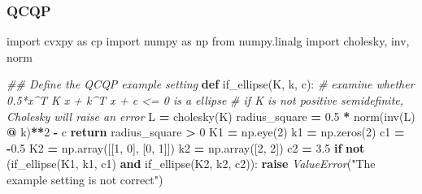 \documentclass[
]{book}
\newenvironment{Shaded}{\begin{snugshade}}{\end{snugshade}}
\newcommand{\CommentTok}[1]{\textcolor[rgb]{0.56,0.35,0.01}{\textit{#1}}}
\newcommand{\ControlFlowTok}[1]{\textcolor[rgb]{0.13,0.29,0.53}{\textbf{#1}}}
\newcommand{\DecValTok}[1]{\textcolor[rgb]{0.00,0.00,0.81}{#1}}
\newcommand{\FloatTok}[1]{\textcolor[rgb]{0.00,0.00,0.81}{#1}}
\newcommand{\ImportTok}[1]{#1}
\newcommand{\KeywordTok}[1]{\textcolor[rgb]{0.13,0.29,0.53}{\textbf{#1}}}
\newcommand{\NormalTok}[1]{#1}
\newcommand{\OperatorTok}[1]{\textcolor[rgb]{0.81,0.36,0.00}{\textbf{#1}}}
\newcommand{\PreprocessorTok}[1]{\textcolor[rgb]{0.56,0.35,0.01}{\textit{#1}}}
\newcommand{\StringTok}[1]{\textcolor[rgb]{0.31,0.60,0.02}{#1}}
\theoremstyle{definition}
\theoremstyle{definition}
\theoremstyle{definition}
\theoremstyle{definition}
\theoremstyle{remark}
\begin{document}
\subsubsection{QCQP}\label{qcqp}

\begin{Shaded}
\begin{Highlighting}[]
\ImportTok{import}\NormalTok{ cvxpy }\ImportTok{as}\NormalTok{ cp}
\ImportTok{import}\NormalTok{ numpy }\ImportTok{as}\NormalTok{ np}
\ImportTok{from}\NormalTok{ numpy.linalg }\ImportTok{import}\NormalTok{ cholesky, inv, norm}

\CommentTok{\#\# Define the QCQP example setting}
\KeywordTok{def}\NormalTok{ if\_ellipse(K, k, c):}
    \CommentTok{\# examine whether 0.5*x\^{}T K x + k\^{}T x + c \textless{}= 0 is a ellipse}
    \CommentTok{\# if K is not positive semidefinite, Cholesky will raise an error}
\NormalTok{    L }\OperatorTok{=}\NormalTok{ cholesky(K) }
\NormalTok{    radius\_square }\OperatorTok{=} \FloatTok{0.5} \OperatorTok{*}\NormalTok{ norm(inv(L) }\OperatorTok{@}\NormalTok{ k)}\OperatorTok{**}\DecValTok{2} \OperatorTok{{-}}\NormalTok{ c}
    \ControlFlowTok{return}\NormalTok{ radius\_square }\OperatorTok{\textgreater{}} \DecValTok{0}
\NormalTok{K1 }\OperatorTok{=}\NormalTok{ np.eye(}\DecValTok{2}\NormalTok{)}
\NormalTok{k1 }\OperatorTok{=}\NormalTok{ np.zeros(}\DecValTok{2}\NormalTok{)}
\NormalTok{c1 }\OperatorTok{=} \OperatorTok{{-}}\FloatTok{0.5}
\NormalTok{K2 }\OperatorTok{=}\NormalTok{ np.array([[}\DecValTok{1}\NormalTok{, }\DecValTok{0}\NormalTok{], [}\DecValTok{0}\NormalTok{, }\DecValTok{1}\NormalTok{]])}
\NormalTok{k2 }\OperatorTok{=}\NormalTok{ np.array([}\DecValTok{2}\NormalTok{, }\DecValTok{2}\NormalTok{])}
\NormalTok{c2 }\OperatorTok{=} \FloatTok{3.5}
\ControlFlowTok{if} \KeywordTok{not}\NormalTok{ (if\_ellipse(K1, k1, c1) }\KeywordTok{and}\NormalTok{ if\_ellipse(K2, k2, c2)):}
    \ControlFlowTok{raise} \PreprocessorTok{ValueError}\NormalTok{(}\StringTok{"The example setting is not correct"}\NormalTok{)}


\end{Highlighting}
\end{Shaded}
\end{document}
